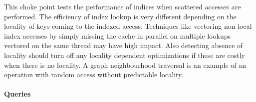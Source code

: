 
This choke point tests the performance of indices when scattered accesses are performed. The efficiency of index lookup is very different depending on the locality of keys coming to the indexed access.
Techniques like vectoring non-local index accesses by simply missing the cache in parallel on multiple lookups vectored on the same thread may have high impact.
Also detecting absence of locality should turn off any locality dependent optimizations if these are costly when there is no locality. A graph neighbourhood traversal is an example of an operation with random access without predictable locality.


\paragraph{Queries}
{\raggedright

}